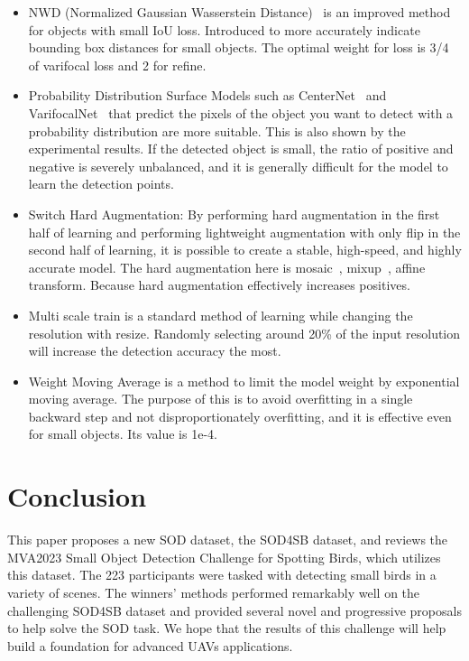 \documentclass{mva_style}
\begin{document}
\begin{itemize}
\item NWD (Normalized Gaussian Wasserstein Distance)~\cite{wang2021normalized,nwd2} is an improved method for objects with small IoU loss. Introduced to more accurately indicate bounding box distances for small objects. The optimal weight for loss is 3/4 of varifocal loss and 2 for refine.
\item Probability Distribution Surface Models such as CenterNet~\cite{zhou2019objects} and VarifocalNet~\cite{zhang2021varifocalnet} that predict the pixels of the object you want to detect with a probability distribution are more suitable. This is also shown by the experimental results. If the detected object is small, the ratio of positive and negative is severely unbalanced, and it is generally difficult for the model to learn the detection points.
\item Switch Hard Augmentation: By performing hard augmentation in the first half of learning and performing lightweight augmentation with only flip in the second half of learning, it is possible to create a stable, high-speed, and highly accurate model. The hard augmentation here is mosaic~\cite{wang2021scaled}, mixup~\cite{zhang2017mixup}, affine transform. Because hard augmentation effectively increases positives.
\item Multi scale train is a standard method of learning while changing the resolution with resize. Randomly selecting around 20\% of the input resolution will increase the detection accuracy the most.
\item Weight Moving Average is a method to limit the model weight by exponential moving average. The purpose of this is to avoid overfitting in a single backward step and not disproportionately overfitting, and it is effective even for small objects. Its value is 1e-4.
\end{itemize}


\section{Conclusion}
This paper proposes a new SOD dataset, the SOD4SB dataset, and reviews the MVA2023 Small Object Detection Challenge for Spotting Birds, which utilizes this dataset. The 223 participants were tasked with detecting small birds in a variety of scenes. The winners' methods performed remarkably well on the challenging SOD4SB dataset and provided several novel and progressive proposals to help solve the SOD task. We hope that the results of this challenge will help build a foundation for advanced UAVs applications.
\end{document}

